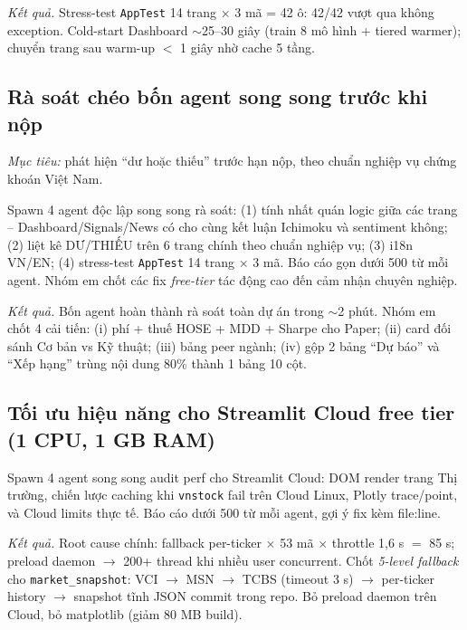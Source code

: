\documentclass[12pt,a4paper]{article}
\begin{document}
\textit{Kết quả.} Stress-test \texttt{AppTest} 14 trang $\times$ 3 mã = 42 ô: 42/42 vượt qua không exception. Cold-start Dashboard $\sim$25--30 giây (train 8 mô hình + tiered warmer); chuyển trang sau warm-up $<$ 1 giây nhờ cache 5 tầng.

\subsection{Rà soát chéo bốn agent song song trước khi nộp}

\textit{Mục tiêu:} phát hiện ``dư hoặc thiếu'' trước hạn nộp, theo chuẩn nghiệp vụ chứng khoán Việt Nam.

\begin{promptbox}
\footnotesize Spawn 4 agent độc lập song song rà soát: (1) tính nhất quán logic giữa các trang -- Dashboard/Signals/News có cho cùng kết luận Ichimoku và sentiment không; (2) liệt kê DƯ/THIẾU trên 6 trang chính theo chuẩn nghiệp vụ; (3) i18n VN/EN; (4) stress-test \texttt{AppTest} 14 trang $\times$ 3 mã. Báo cáo gọn dưới 500 từ mỗi agent. Nhóm em chốt các fix \emph{free-tier} tác động cao đến cảm nhận chuyên nghiệp.
\end{promptbox}

\textit{Kết quả.} Bốn agent hoàn thành rà soát toàn dự án trong $\sim$2 phút. Nhóm em chốt 4 cải tiến: (i) phí + thuế HOSE + MDD + Sharpe cho Paper; (ii) card đối sánh Cơ bản vs Kỹ thuật; (iii) bảng peer ngành; (iv) gộp 2 bảng ``Dự báo'' và ``Xếp hạng'' trùng nội dung 80\% thành 1 bảng 10 cột.

\subsection{Tối ưu hiệu năng cho Streamlit Cloud free tier (1 CPU, 1 GB RAM)}

\begin{promptbox}
\footnotesize Spawn 4 agent song song audit perf cho Streamlit Cloud: DOM render trang Thị trường, chiến lược caching khi \texttt{vnstock} fail trên Cloud Linux, Plotly trace/point, và Cloud limits thực tế. Báo cáo dưới 500 từ mỗi agent, gợi ý fix kèm file:line.
\end{promptbox}

\textit{Kết quả.} Root cause chính: fallback per-ticker $\times$ 53 mã $\times$ throttle 1{,}6 s $=$ 85 s; preload daemon $\to$ 200+ thread khi nhiều user concurrent. Chốt \emph{5-level fallback} cho \texttt{market\_snapshot}: VCI $\to$ MSN $\to$ TCBS (timeout 3 s) $\to$ per-ticker history $\to$ snapshot tĩnh JSON commit trong repo. Bỏ preload daemon trên Cloud, bỏ matplotlib (giảm 80 MB build).
\end{document}
